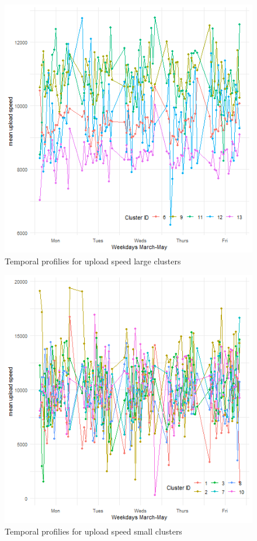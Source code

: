\documentclass[]{interact}
\theoremstyle{plain}%
\theoremstyle{definition}
\theoremstyle{remark}
\begin{document}
\begin{figure}
\includegraphics[width=0.95\linewidth]{figures/upClusterL} \caption{\label{UpClusterL}Temporal profilies for upload speed large clusters}\label{fig:unnamed-chunk-2}
\end{figure}

\begin{figure}
\includegraphics[width=0.95\linewidth]{figures/upClusterS} \caption{\label{UpClusterS}Temporal profilies for upload speed small clusters}\label{fig:unnamed-chunk-3}
\end{figure}
\end{document}
